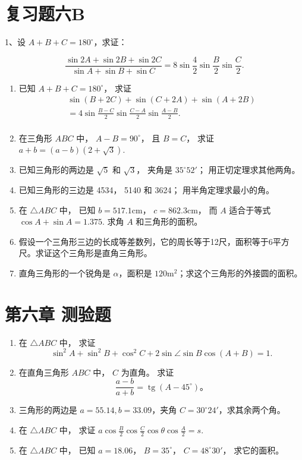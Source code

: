 \section{复习题六B}

1、设 \(A + B + C = 180^{\circ}\)，求证：

\[
\frac {\sin 2 A + \sin 2 B + \sin 2 C}{\sin A + \sin B + \sin C} = 8 \sin \frac {4}{2} \sin \frac {B}{2} \sin \frac {C}{2}.
\]

\begin{enumerate}[start=2]
\item
  已知 \(A + B + C = 180^{\circ}\)， 求证
\[
\begin{array}{l} \sin (B + 2 C) + \sin (C + 2 A) + \sin (A + 2 B) \\ = 4 \sin \frac {B - C}{2} \sin \frac {C - A}{2} \sin \frac {A - B}{2}. \\ \end{array}
\]
\item
  在三角形 \(ABC\) 中， \(A - B = 90^\circ\)， 且 \(B = C\)， 求证
  \(a + b = (a - b)(2 + \sqrt{3})\).
\item
  已知三角形的两边是 \(\sqrt{5}\) 和 \(\sqrt{3}\)， 夹角是
  \(35^{\circ}52'\)； 用正切定理求其他两角。
\item
  已知三角形的三边是 4534， 5140 和 3624； 用半角定理求最小的角。
\item
  在 \(\triangle ABC\) 中， 已知 \(b = 517.1\mathrm{cm}\)，
  \(c = 862.3\mathrm{cm}\)， 而 \(A\) 适合于等式
  \(\cos A + \sin A = 1.375\). 求角 \(A\) 和三角形的面积。
\item
  假设一个三角形三边的长成等差数列，它的周长等于12尺，面积等于6平方尺。求证这个三角形是直角三角形。
\item
  直角三角形的一个锐角是 \(\alpha\)，面积是
  \(120\mathrm{m}^2\)；求这个三角形的外接圆的面积。
\end{enumerate}

\section{第六章 测验题}

\begin{enumerate}
\item
  在 \(\triangle ABC\) 中， 求证
\[
\sin^ {2} A + \sin^ {2} B + \cos^ {2} C + 2 \sin \angle \sin B \cos (A + B) = 1.
\]
\item
  在直角三角形 \(ABC\) 中， \(C\) 为直角。 求证
\[
\frac {a - b}{a + b} = \operatorname{tg} (A - 45 ^{\circ})\text{。}
\]
\item
  三角形的两边是 \(a = 55.14, b = 33.09\)，夹角
  \(C = 30^{\circ}24'\)，求其余两个角。
\item
  在 \(\triangle ABC\) 中， 求证
  \(a\cos \frac{B}{2}\cos \frac{C}{2}\cos \theta \cos \frac{A}{2} = s\).
\item
  在 \(\triangle ABC\) 中， 已知 \(a = 18.06\)， \(B = 35^\circ\)，
  \(C = 48^\circ 30'\)， 求它的面积。
\end{enumerate}

